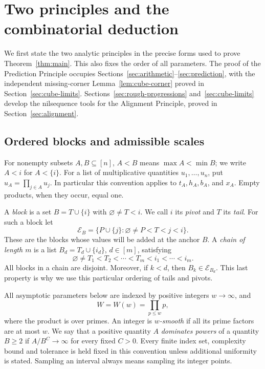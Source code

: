 \section{Two principles and the combinatorial deduction}
\label{sec:framework}

We first state the two analytic principles in the precise forms used to
prove Theorem~\ref{thm:main}. This also fixes the order of all parameters.
The proof of the Prediction Principle occupies
Sections~\ref{sec:arithmetic}--\ref{sec:prediction}, with the independent
missing-corner Lemma~\ref{lem:cube-corner} proved in
Section~\ref{sec:cube-limits}.
Sections~\ref{sec:rough-progressions} and~\ref{sec:cube-limits} develop the
nilsequence tools for the Alignment Principle, proved in
Section~\ref{sec:alignment}.

\subsection{Ordered blocks and admissible scales}

For nonempty subsets $A,B\subseteq[n]$,
$A<B$ means $\max A<\min B$; we write $A<i$ for $A<\{i\}$.
For a list of multiplicative quantities $u_1,\ldots,u_n$, put
$u_A=\prod_{j\in A}u_j$. In particular this convention applies to
$t_A,h_A,b_A$, and $x_A$. Empty products, when they occur, equal one.

A \emph{block} is a set $B=T\cup\{i\}$ with $\varnothing\ne T<i$.
We call $i$ its \emph{pivot} and $T$ its \emph{tail}. For such a block let
\begin{equation}\label{eq:adding-blocks}
 \mathcal E_B=
 \bigl\{P\cup\{j\}:\varnothing\ne P<T<j<i\bigr\}.
\end{equation}
These are the blocks whose values will be added at the anchor $B$.
A \emph{chain of length $m$} is a list
$B_d=T_d\cup\{i_d\}$, $d\in[m]$, satisfying
\begin{equation}\label{eq:block-chain}
 \varnothing\ne T_1<T_2<\cdots<T_m<i_1<\cdots<i_m.
\end{equation}
All blocks in a chain are disjoint. Moreover, if $k<d$, then
$B_k\in\mathcal E_{B_d}$. This last property is why we use this particular
ordering of tails and pivots.

All asymptotic parameters below are indexed by positive integers
$w\to\infty$, and
\[
 W=W(w)=\prod_{p\le w}p,
\]
where the product is over primes. An integer is \emph{$w$-smooth} if all
its prime factors are at most $w$. We say that a positive quantity $A$
\emph{dominates powers} of a quantity $B\ge2$ if
$A/B^C\to\infty$ for every fixed $C>0$. Every finite index set,
complexity bound and tolerance is held fixed in this convention unless
additional uniformity is stated. Sampling an interval always means
sampling its integer points.

